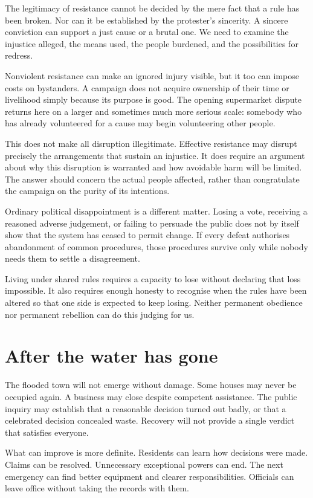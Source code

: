 \documentclass[12pt,a4paper]{book}
\begin{document}
The legitimacy of resistance cannot be decided by the mere fact that a rule has been broken. Nor can it be established by the protester's sincerity. A sincere conviction can support a just cause or a brutal one. We need to examine the injustice alleged, the means used, the people burdened, and the possibilities for redress.

Nonviolent resistance can make an ignored injury visible, but it too can impose costs on bystanders. A campaign does not acquire ownership of their time or livelihood simply because its purpose is good. The opening supermarket dispute returns here on a larger and sometimes much more serious scale: somebody who has already volunteered for a cause may begin volunteering other people.

This does not make all disruption illegitimate. Effective resistance may disrupt precisely the arrangements that sustain an injustice. It does require an argument about why this disruption is warranted and how avoidable harm will be limited. The answer should concern the actual people affected, rather than congratulate the campaign on the purity of its intentions.

Ordinary political disappointment is a different matter. Losing a vote, receiving a reasoned adverse judgement, or failing to persuade the public does not by itself show that the system has ceased to permit change. If every defeat authorises abandonment of common procedures, those procedures survive only while nobody needs them to settle a disagreement.

Living under shared rules requires a capacity to lose without declaring that loss impossible. It also requires enough honesty to recognise when the rules have been altered so that one side is expected to keep losing. Neither permanent obedience nor permanent rebellion can do this judging for us.

\section*{After the water has gone}

The flooded town will not emerge without damage. Some houses may never be occupied again. A business may close despite competent assistance. The public inquiry may establish that a reasonable decision turned out badly, or that a celebrated decision concealed waste. Recovery will not provide a single verdict that satisfies everyone.

What can improve is more definite. Residents can learn how decisions were made. Claims can be resolved. Unnecessary exceptional powers can end. The next emergency can find better equipment and clearer responsibilities. Officials can leave office without taking the records with them.
\end{document}
